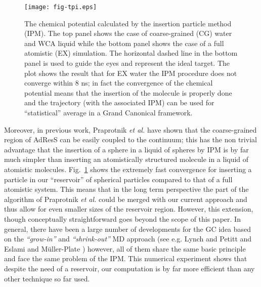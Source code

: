 \documentclass[aip,jcp,a4paper,reprint,onecolumn]{revtex4-1}
\newcommand{\redc}[1]{{\color{red} #1}}
\begin{document}
\begin{figure}
  \centering
  \texttt{[image: fig-tpi.eps]}
  \caption{\redc{The chemical potential calculated by the insertion particle method (IPM). The top panel shows the case of coarse-grained (CG) water and WCA liquid while the bottom panel shows the case of a full atomistic (EX) simulation. The horizontal dashed line in the bottom panel
        is used to guide the eyes and represent the ideal target. The plot shows
        the result that for EX water the IPM procedure does not converge within 8 \textsf{ns};
      in fact the convergence of the chemical potential means that the insertion of the molecule is properly done and the trajectory (with the associated IPM) can be used for ``statistical'' average in a Grand Canonical framework.}}
  \label{fig:tmp4}
\end{figure}
\redc{Moreover, in previous work, Praprotnik {\it et al.} \cite{delgado2009coupling} have shown that the coarse-grained region of AdResS can be easily coupled to the continuum; this has the non trivial advantage that the insertion of a sphere in a liquid of spheres by IPM is by far much simpler than inserting an atomistically structured molecule in a liquid of atomistic molecules. Fig.~\ref{fig:tmp4} shows the extremely fast convergence for inserting a particle in our ``reservoir'' of spherical particles compared to that of a full atomistic system. This means that in the long term perspective the part of the algorithm of Praprotnik {\it et al.} could be merged with our current approach and thus allow for even smaller sizes of the reservoir region. However, this extension, though conceptually straightforward goes beyond the scope of this paper. In general, there have been a large number of developments for the GC idea based on the {\it ``grow-in''} and {\it ``shrink-out''} MD approach (see e.g. Lynch and Petitt \cite{pet5} and Eslami and M\"uller-Plate \cite{flo}) however, all of them  share the same basic principle and face the same problem of the IPM. This numerical experiment shows that despite the need of a reservoir, our computation is by far more efficient than any other technique so far used.}
 
\end{document}
